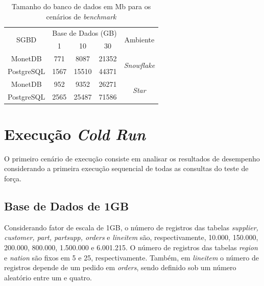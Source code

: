 \begin{table}[htpb]
    \centering
    \caption{Tamanho do banco de dados em Mb para os cenários de \textit{benchmark}}
    \label{tab:carregamento_size}
    \begin{tabular}{c|ccc|c}
        \hline
        \multirow{2}{*}{SGBD} & \multicolumn{3}{c|}{Base de Dados (GB)} & \multirow{2}{*}{Ambiente}  \\
                              & 1           & 10          & 30          &                            \\ \hline
        MonetDB               & 771         & 8087        & 21352       & \multirow{2}{*}{\textit{Snowflake}} \\
        PostgreSQL            & 1567        & 15510       & 44371       &                            \\ \hline
        MonetDB               & 952         & 9352        & 26271       & \multirow{2}{*}{\textit{Star}}      \\
        PostgreSQL            & 2565        & 25487       & 71586       &                            \\ \hline
        \end{tabular}
    \end{table}


\section{Execução \textit{Cold Run}}

O primeiro cenário de execução consiste em analisar os resultados de desempenho considerando a primeira execução sequencial de todas as consultas do teste de força. 

\subsection{Base de Dados de 1GB}

Considerando fator de escala de 1GB, o número de registros das tabelas \textit{supplier, customer, part, partsupp, orders} e \textit{lineitem} são, respectivamente, 10.000, 150.000, 200.000, 800.000, 1.500.000 e 6.001.215. O número de registros das tabelas \textit{region} e \textit{nation} são fixos em 5 e 25, respectivamente. Também, em \textit{lineitem} o número de registros depende de um pedido em \textit{orders}, sendo definido sob um número aleatório entre um e quatro.

